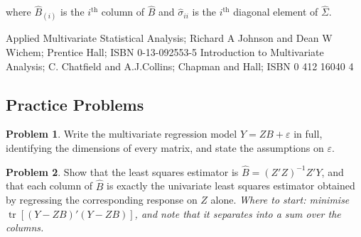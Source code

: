 \documentclass[11pt,a4paper]{article}
\theoremstyle{definition}
\newtheorem{problemx}{Problem}[section]
\newenvironment{problem}{\begin{problemx}}{\end{problemx}}
\begin{document}
where $\widehat{B}_{(i)}$ is the $i^{\text{th}}$ column of $\widehat{B}$ and $\widehat{\sigma}_{ii}$ is the $i^{\text{th}}$ diagonal element of $\widehat{\Sigma}$.\\

































\pagebreak
\begin{thebibliography}{}
Applied Multivariate Statistical Analysis; Richard A Johnson and Dean W Wichem; Prentice Hall; ISBN 0-13-092553-5
Introduction to Multivariate Analysis; C. Chatfield and A.J.Collins; Chapman and Hall; ISBN 0 412 16040 4
\end{thebibliography}



\newpage

\subsection{Practice Problems}

\begin{problem}
Write the multivariate regression model $Y = ZB + \varepsilon$ in full,
identifying the dimensions of every matrix, and state the assumptions on
$\varepsilon$.
\end{problem}

\begin{problem}
Show that the least squares estimator is
$\widehat{B} = \left(Z'Z\right)^{-1}Z'Y$, and that each column of $\widehat{B}$
is exactly the univariate least squares estimator obtained by regressing the
corresponding response on $Z$ alone.
\emph{Where to start: minimise $\operatorname{tr}\left[(Y-ZB)'(Y-ZB)\right]$,
and note that it separates into a sum over the columns.}
\end{problem}
\end{document}
